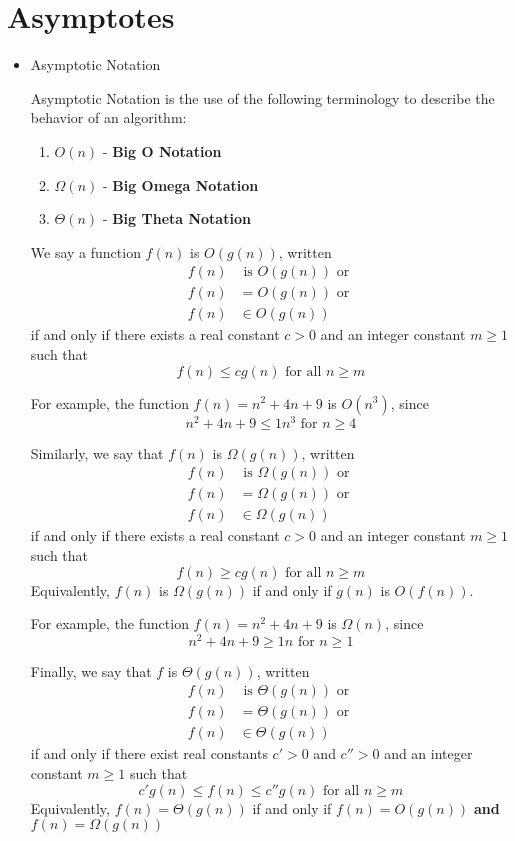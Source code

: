\documentclass[a4paper]{article}
\begin{document}
\section{Asymptotes}
\begin{itemize}
\item Asymptotic Notation

Asymptotic Notation is the use of the following terminology to describe the behavior of an algorithm:
\begin{enumerate}
\item $O(n)$ - \textbf{Big O Notation}
\item $\Omega(n)$ - \textbf{Big Omega Notation}
\item $\Theta(n)$ - \textbf{Big Theta Notation}
\end{enumerate}

We say a function $f(n)$ is $O(g(n))$, written \begin{align*}f(n) &\text{ is } O(g(n))\text{ or }\\f(n)&=O(g(n))\text{ or }\\f(n)&\in O(g(n))\end{align*} if and only if there exists a real constant $c>0$ and an integer constant $m\geq1$ such that \[f(n)\leq cg(n) \text{ for all }n\geq m\]

For example, the function $f(n)=n^2+4n+9$ is $O(n^3)$, since \[n^2+4n+9\leq 1n^3\text{ for } n\geq4\]

Similarly, we say that $f(n)$ is $\Omega(g(n))$, written \begin{align*}f(n) &\text{ is } \Omega(g(n))\text{ or }\\f(n)&=\Omega(g(n))\text{ or }\\f(n)&\in \Omega(g(n))\end{align*} if and only if there exists a real constant $c>0$ and an integer constant $m\geq1$ such that \[f(n)\geq cg(n) \text{ for all }n\geq m\] Equivalently, $f(n)$ is $\Omega(g(n))$ if and only if $g(n)$ is $O(f(n))$. 

For example, the function $f(n)=n^2+4n+9$ is $\Omega(n)$, since \[n^2+4n+9\geq 1n\text{ for }n\geq1\]

Finally, we say that $f$ is $\Theta(g(n))$, written \begin{align*}f(n) &\text{ is } \Theta(g(n))\text{ or }\\f(n)&=\Theta(g(n))\text{ or }\\f(n)&\in \Theta(g(n))\end{align*} if and only if there exist real constants $c'>0$ and $c''>0$ and an integer constant $m\geq1$ such that \[c'g(n) \leq f(n)\leq c''g(n) \text{ for all }n\geq m\] Equivalently, $f(n)=\Theta(g(n))$ if and only if $f(n)=O(g(n))$ \textbf{and} $f(n)=\Omega(g(n))$


\end{itemize}
\end{document}
